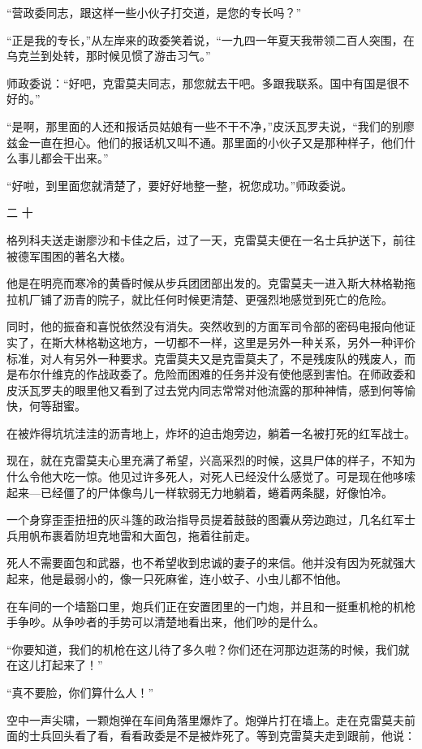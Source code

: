 “营政委同志，跟这样一些小伙子打交道，是您的专长吗？”

“正是我的专长，”从左岸来的政委笑着说，“一九四一年夏天我带领二百人突围，在乌克兰到处转，那时候见惯了游击习气。”

师政委说：“好吧，克雷莫夫同志，那您就去干吧。多跟我联系。国中有国是很不好的。”

“是啊，那里面的人还和报话员姑娘有一些不干不净，”皮沃瓦罗夫说，“我们的别廖兹金一直在担心。他们的报话机又叫不通。那里面的小伙子又是那种样子，他们什么事儿都会干出来。”

“好啦，到里面您就清楚了，要好好地整一整，祝您成功。”师政委说。

二 十

格列科夫送走谢廖沙和卡佳之后，过了一天，克雷莫夫便在一名士兵护送下，前往被德军围困的著名大楼。

他是在明亮而寒冷的黄昏时候从步兵团团部出发的。克雷莫夫一进入斯大林格勒拖拉机厂铺了沥青的院子，就比任何时候更清楚、更强烈地感觉到死亡的危险。

同时，他的振奋和喜悦依然没有消失。突然收到的方面军司令部的密码电报向他证实了，在斯大林格勒这地方，一切都不一样，这里是另外一种关系，另外一种评价标准，对人有另外一种要求。克雷莫夫又是克雷莫夫了，不是残废队的残废人，而是布尔什维克的作战政委了。危险而困难的任务并没有使他感到害怕。在师政委和皮沃瓦罗夫的眼里他又看到了过去党内同志常常对他流露的那种神情，感到何等愉快，何等甜蜜。

在被炸得坑坑洼洼的沥青地上，炸坏的迫击炮旁边，躺着一名被打死的红军战士。

现在，就在克雷莫夫心里充满了希望，兴高采烈的时候，这具尸体的样子，不知为什么令他大吃一惊。他见过许多死人，对死人已经没什么感觉了。可是现在他哆嗦起来—已经僵了的尸体像鸟儿一样软弱无力地躺着，蜷着两条腿，好像怕冷。

一个身穿歪歪扭扭的灰斗篷的政治指导员提着鼓鼓的图囊从旁边跑过，几名红军士兵用帆布裹着防坦克地雷和大面包，拖着往前走。

死人不需要面包和武器，也不希望收到忠诚的妻子的来信。他并没有因为死就强大起来，他是最弱小的，像一只死麻雀，连小蚊子、小虫儿都不怕他。

在车间的一个墙豁口里，炮兵们正在安置团里的一门炮，并且和一挺重机枪的机枪手争吵。从争吵者的手势可以清楚地看出来，他们吵的是什么。

“你要知道，我们的机枪在这儿待了多久啦？你们还在河那边逛荡的时候，我们就在这儿打起来了！”

“真不要脸，你们算什么人！”

空中一声尖啸，一颗炮弹在车间角落里爆炸了。炮弹片打在墙上。走在克雷莫夫前面的士兵回头看了看，看看政委是不是被炸死了。等到克雷莫夫走到跟前，他说：

